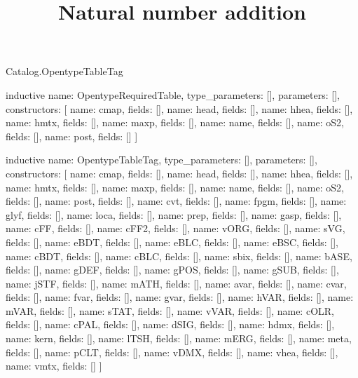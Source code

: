 \begin{lexlean}{Catalog.OpentypeTableTag}
\title{Natural number addition}
\begin{semanticmodule}
inductive{
  name: OpentypeRequiredTable,
  type_parameters: [],
  parameters: [],
  constructors: [
    {name: cmap, fields: []},
    {name: head, fields: []},
    {name: hhea, fields: []},
    {name: hmtx, fields: []},
    {name: maxp, fields: []},
    {name: name, fields: []},
    {name: oS2, fields: []},
    {name: post, fields: []}
  ]
}

inductive{
  name: OpentypeTableTag,
  type_parameters: [],
  parameters: [],
  constructors: [
    {name: cmap, fields: []},
    {name: head, fields: []},
    {name: hhea, fields: []},
    {name: hmtx, fields: []},
    {name: maxp, fields: []},
    {name: name, fields: []},
    {name: oS2, fields: []},
    {name: post, fields: []},
    {name: cvt, fields: []},
    {name: fpgm, fields: []},
    {name: glyf, fields: []},
    {name: loca, fields: []},
    {name: prep, fields: []},
    {name: gasp, fields: []},
    {name: cFF, fields: []},
    {name: cFF2, fields: []},
    {name: vORG, fields: []},
    {name: sVG, fields: []},
    {name: eBDT, fields: []},
    {name: eBLC, fields: []},
    {name: eBSC, fields: []},
    {name: cBDT, fields: []},
    {name: cBLC, fields: []},
    {name: sbix, fields: []},
    {name: bASE, fields: []},
    {name: gDEF, fields: []},
    {name: gPOS, fields: []},
    {name: gSUB, fields: []},
    {name: jSTF, fields: []},
    {name: mATH, fields: []},
    {name: avar, fields: []},
    {name: cvar, fields: []},
    {name: fvar, fields: []},
    {name: gvar, fields: []},
    {name: hVAR, fields: []},
    {name: mVAR, fields: []},
    {name: sTAT, fields: []},
    {name: vVAR, fields: []},
    {name: cOLR, fields: []},
    {name: cPAL, fields: []},
    {name: dSIG, fields: []},
    {name: hdmx, fields: []},
    {name: kern, fields: []},
    {name: lTSH, fields: []},
    {name: mERG, fields: []},
    {name: meta, fields: []},
    {name: pCLT, fields: []},
    {name: vDMX, fields: []},
    {name: vhea, fields: []},
    {name: vmtx, fields: []}
  ]
}
\end{semanticmodule}
\end{lexlean}
